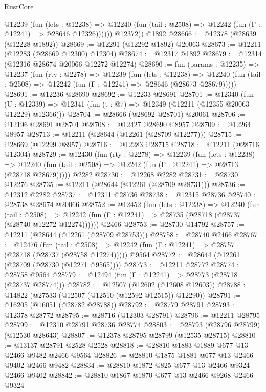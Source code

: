 \begin{lexlean}{RustCore}
\begin{coremodule}
            @12239
              (fun (lets : @12238) =>
              @12240 (fun (tail : @2508) => @12242 (fun (Γ : @12241) => @28646 @12326))))))
        @12372))
    @1892
@28666 := @12378 (@28639 (@12228 @1892))
@28669 := @12291 (@12292 @1892) @20063
@28673 := @12211 (@12283 (@28669 @12300) @12304)
@28674 := @12317 @1892
@28679 := @12314 (@12316 @28674 @20066 @12272 @12274)
@28690 := fun (params : @12235) =>
  @12237
    (fun (rty : @2278) =>
    @12239
      (fun (lets : @12238) =>
      @12240 (fun (tail : @2508) => @12242 (fun (Γ : @12241) => @28646 (@28673 @28679)))))
@28691 := @12236 @28690
@28692 := @12233 @28691
@28701 := @12340
    (fun (U : @12339) => @12341 (fun (t : @7) => @12349 (@12211 (@12355 @20063 @12229) @12366)))
@28704 := @28666 (@28692 @28701) @20061
@28706 := @12196 @28691 @28701
@28708 := @12427 @28690 @8957
@28709 := @12264 @8957
@28713 := @12211 (@28644 (@12261 (@28709 @12277)))
@28715 := @28669 (@12299 @8957)
@28716 := @12283 @28715
@28718 := @12211 (@28716 @12304)
@28729 := @12430
    (fun (rty : @2278) =>
    @12239
      (fun (lets : @12238) =>
      @12240 (fun (tail : @2508) => @12242 (fun (Γ : @12241) => @28713 (@28718 @28679)))))
    @2282
@28730 := @12268 @2282
@28731 := @28730 @12276
@28735 := @12211 (@28644 (@12261 (@28709 @28731)))
@28736 := @12312 @2282
@28737 := @12311 @28736
@28738 := @12315 @28736
@28740 := @28738 @28674 @20066
@28752 := @12452
    (fun (lets : @12238) =>
    @12240
      (fun (tail : @2508) =>
      @12242 (fun (Γ : @12241) => @28735 (@28718 (@28737 (@28740 @12272 @12274))))))
    @2466
@28753 := @28730 @14792
@28757 := @12211 (@28644 (@12261 (@28709 @28753)))
@28758 := @28740 @2466
@28767 := @12476
    (fun (tail : @2508) => @12242 (fun (Γ : @12241) => @28757 (@28718 (@28737 (@28758 @12274)))))
    @9564
@28772 := @28644 (@12261 (@28709 (@28730 (@12271 @9565))))
@28773 := @12211 @28772
@28774 := @28758 @9564
@28779 := @12494 (fun (Γ : @12241) => @28773 (@28718 (@28737 @28774)))
@28782 := @12507 (@12602 (@12608 @12603))
@28788 := @14822 (@27533 (@12507 (@12510 (@12592 @12515)) @12290))
@28791 := @16205 (@16051 (@28782 @28788))
@28792 := @28779 @28791
@28793 := @12378 @28772
@28795 := @28716 (@12303 @28791)
@28796 := @12211 @28795
@28799 := @12310 @28791 @28736 @28774
@28803 := @28793 (@28796 @28799) (@12530 @28643)
@28807 := @12378 @28795 @28799 (@12535 @28715)
@28810 := @13137 @28791 @2528 @2528
@28818 := @28810 @1883 @1889 @677 @13 @2466 @9482 @2466 @9564
@28826 := @28810 @1875 @1881 @677 @13 @2466 @9402 @2466 @9482
@28834 := @28810 @1872 @825 @677 @13 @2466 @9324 @2466 @9402
@28842 := @28810 @1867 @1870 @677 @13 @2466 @9268 @2466 @9324

\end{coremodule}
\end{lexlean}
